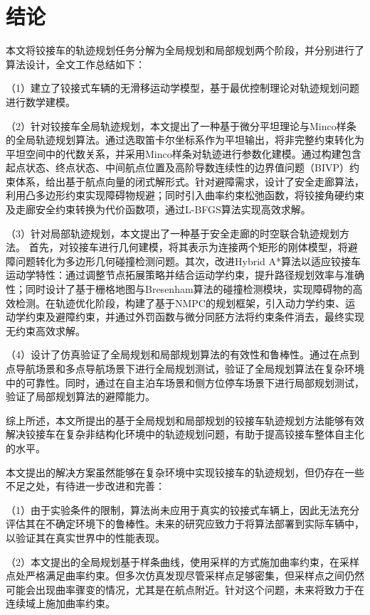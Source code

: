 \documentclass[master,academic]{ysuthesis} %
\begin{document}
	\chapter{结论}
	本文将铰接车的轨迹规划任务分解为全局规划和局部规划两个阶段，并分别进行了算法设计，全文工作总结如下：

	（1）建立了铰接式车辆的无滑移运动学模型，基于最优控制理论对轨迹规划问题进行数学建模。

	（2）针对铰接车全局轨迹规划，本文提出了一种基于微分平坦理论与Minco样条的全局轨迹规划算法。通过选取笛卡尔坐标系作为平坦输出，将非完整约束转化为平坦空间中的代数关系，并采用Minco样条对轨迹进行参数化建模。通过构建包含起点状态、终点状态、中间航点位置及高阶导数连续性的边界值问题（BIVP）约束体系，给出基于航点向量的闭式解形式。针对避障需求，设计了安全走廊算法，利用凸多边形约束实现障碍物规避；同时引入曲率约束松弛函数，将铰接角硬约束及走廊安全约束转换为代价函数项，通过L-BFGS算法实现高效求解。

	（3）针对局部轨迹规划，本文提出了一种基于安全走廊的时空联合轨迹规划方法。 首先，对铰接车进行几何建模，将其表示为连接两个矩形的刚体模型，将避障问题转化为多边形几何碰撞检测问题。其次，改进Hybrid A*算法以适应铰接车运动学特性：通过调整节点拓展策略并结合运动学约束，提升路径规划效率与准确性；同时设计了基于栅格地图与Bresenham算法的碰撞检测模块，实现障碍物的高效检测。在轨迹优化阶段，构建了基于NMPC的规划框架，引入动力学约束、运动学约束及避障约束，并通过外罚函数与微分同胚方法将约束条件消去，最终实现无约束高效求解。

	（4）设计了仿真验证了全局规划和局部规划算法的有效性和鲁棒性。通过在点到点导航场景和多点导航场景下进行全局规划测试，验证了全局规划算法在复杂环境中的可靠性。同时，通过在自主泊车场景和侧方位停车场景下进行局部规划测试，验证了局部规划算法的避障能力。

	综上所述，本文所提出的基于全局规划和局部规划的铰接车轨迹规划方法能够有效解决铰接车在复杂非结构化环境中的轨迹规划问题，有助于提高铰接车整体自主化的水平。

	本文提出的解决方案虽然能够在复杂环境中实现铰接车的轨迹规划，但仍存在一些不足之处，有待进一步改进和完善：

	（1）由于实验条件的限制，算法尚未应用于真实的铰接式车辆上，因此无法充分评估其在不确定环境下的鲁棒性。未来的研究应致力于将算法部署到实际车辆中，以验证其在真实世界中的性能表现。

	（2）本文提出的全局规划基于样条曲线，使用采样的方式施加曲率约束，在采样点处严格满足曲率约束。但多次仿真发现尽管采样点足够密集，但采样点之间仍然可能会出现曲率骤变的情况，尤其是在航点附近。针对这个问题，未来将致力于在连续域上施加曲率约束。
\end{document}
